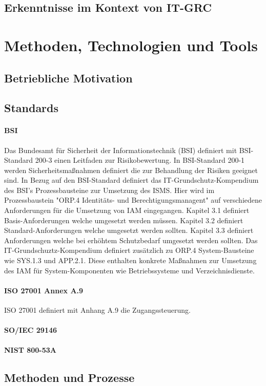 \documentclass[10pt]{article}
\begin{document}
\subsection{Erkenntnisse im Kontext von IT-GRC}
\section{Methoden, Technologien und Tools}
\subsection{Betriebliche Motivation}
\subsection{Standards}
\paragraph{BSI}
Das Bundesamt für Sicherheit der Informationstechnik (BSI) definiert mit BSI-Standard 200-3 einen Leitfaden zur Risikobewertung. In BSI-Standard 200-1 werden Sicherheitsmaßnahmen definiert die zur Behandlung der Risiken geeignet sind. In Bezug auf den BSI-Standard definiert das IT-Grundschutz-Kompendium des BSI's Prozessbausteine zur Umsetzung des ISMS. Hier wird im Prozessbaustein "ORP.4 Identitäts- und Berechtigungsmanagent" auf verschiedene Anforderungen für die Umsetzung von IAM eingegangen. Kapitel 3.1 definiert Basis-Anforderungen welche umgesetzt werden müssen. Kapitel 3.2 definiert Standard-Anforderungen welche umgesetzt werden sollten. Kapitel 3.3 definiert Anforderungen welche bei erhöhtem Schutzbedarf umgesetzt werden sollten. Das IT-Grundschuztz-Kompendium definiert zusätzlich zu ORP.4 System-Bausteine wie SYS.1.3 und APP.2.1. Diese enthalten konkrete Maßnahmen zur Umsetzung des IAM für System-Komponenten wie Betriebssysteme und Verzeichnisdienste.
\paragraph{ISO 27001 Annex A.9}
ISO 27001 definiert mit Anhang A.9 die Zugangssteuerung.
\paragraph{SO/IEC 29146}
\paragraph{NIST 800-53A}
\subsection{Methoden und Prozesse}
\end{document}
